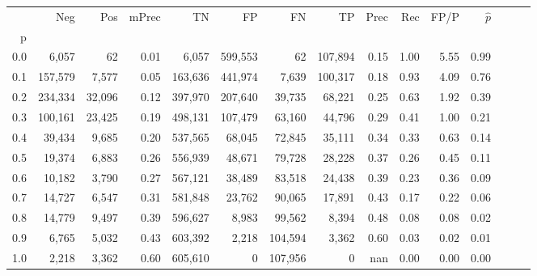 \begin{tabular}{rrrrrrrrrrrrrrr}
\toprule
{} &      Neg &     Pos & mPrec &       TN &       FP &       FN &       TP &  Prec &   Rec &  FP/P & $\hat{p}$ \\
p   &          &         &       &          &          &          &          &       &       &       &           \\
\midrule
0.0 &    6,057 &      62 &  0.01 &    6,057 &  599,553 &       62 &  107,894 &  0.15 &  1.00 &  5.55 &      0.99 \\
0.1 &  157,579 &   7,577 &  0.05 &  163,636 &  441,974 &    7,639 &  100,317 &  0.18 &  0.93 &  4.09 &      0.76 \\
0.2 &  234,334 &  32,096 &  0.12 &  397,970 &  207,640 &   39,735 &   68,221 &  0.25 &  0.63 &  1.92 &      0.39 \\
0.3 &  100,161 &  23,425 &  0.19 &  498,131 &  107,479 &   63,160 &   44,796 &  0.29 &  0.41 &  1.00 &      0.21 \\
0.4 &   39,434 &   9,685 &  0.20 &  537,565 &   68,045 &   72,845 &   35,111 &  0.34 &  0.33 &  0.63 &      0.14 \\
0.5 &   19,374 &   6,883 &  0.26 &  556,939 &   48,671 &   79,728 &   28,228 &  0.37 &  0.26 &  0.45 &      0.11 \\
0.6 &   10,182 &   3,790 &  0.27 &  567,121 &   38,489 &   83,518 &   24,438 &  0.39 &  0.23 &  0.36 &      0.09 \\
0.7 &   14,727 &   6,547 &  0.31 &  581,848 &   23,762 &   90,065 &   17,891 &  0.43 &  0.17 &  0.22 &      0.06 \\
0.8 &   14,779 &   9,497 &  0.39 &  596,627 &    8,983 &   99,562 &    8,394 &  0.48 &  0.08 &  0.08 &      0.02 \\
0.9 &    6,765 &   5,032 &  0.43 &  603,392 &    2,218 &  104,594 &    3,362 &  0.60 &  0.03 &  0.02 &      0.01 \\
1.0 &    2,218 &   3,362 &  0.60 &  605,610 &        0 &  107,956 &        0 &   nan &  0.00 &  0.00 &      0.00 \\
\bottomrule
\end{tabular}
